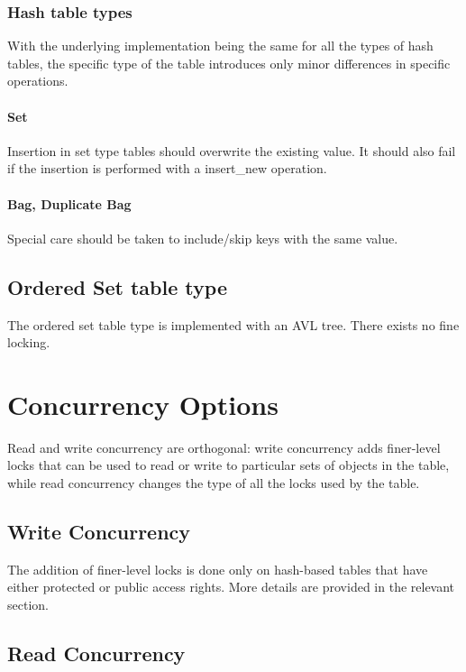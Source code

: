 \documentclass[aps,pre,preprint,nofootinbib]{revtex4}
\begin{document}
\subsubsection{Hash table types}     %

With the underlying implementation being the same for all the types of hash tables, the specific type of the table introduces only minor differences in specific operations.

\paragraph{Set}

Insertion in set type tables should overwrite the existing value.
It should also fail if the insertion is performed with a insert\_new operation.

\paragraph{Bag, Duplicate Bag}

Special care should be taken to include/skip keys with the same value.

\subsection{Ordered Set table type}

The ordered set table type is implemented with an AVL tree.
There exists no fine locking.

\section{Concurrency Options} \label{sec:concurrency_options}

Read and write concurrency are orthogonal:
write concurrency adds finer-level locks that can be used to read or write to particular sets of objects in the table, while read concurrency changes the type of all the locks used by the table.

\subsection{Write Concurrency}

The addition of finer-level locks is done only on hash-based tables that have either protected or public access rights.
More details are provided in the relevant section.

\subsection{Read Concurrency}
\end{document}
